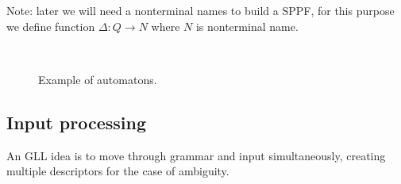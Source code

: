 \documentclass[runningheads,a4paper]{llncs}
\begin{document}
Note: later we will need a nonterminal names to build a SPPF, for this purpose we define function $\Delta : Q \to N$ where $N$
is nonterminal name.

\begin{figure}
    \centering
    ~
    ~
    \caption{Example of automatons.}
    \label{fig:fig1}
\end{figure}



\subsection{Input processing}%
An GLL idea is to move through grammar and input simultaneously,
creating multiple descriptors for the case of ambiguity.
\end{document}
